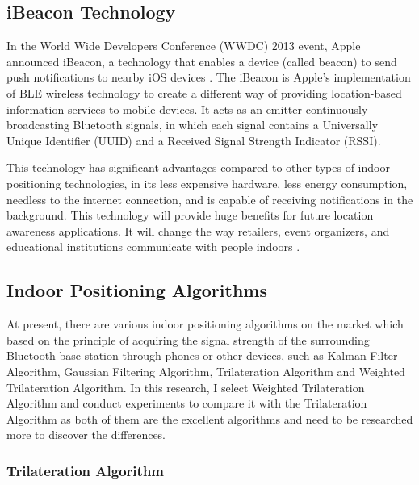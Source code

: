 \documentclass{sigchi}
\begin{document}
\subsection{iBeacon Technology}

In the World Wide Developers Conference (WWDC) 2013 event, Apple announced iBeacon, a technology that enables a device (called beacon) to send push notifications to nearby iOS devices \cite{conte2014bluesentinel}. The iBeacon is Apple's implementation of BLE wireless technology to create a different way of providing location-based information services to mobile devices. It acts as an emitter continuously broadcasting Bluetooth signals, in which each signal contains a Universally Unique Identifier (UUID) and a Received Signal Strength Indicator (RSSI).

This technology has significant advantages compared to other types of indoor positioning technologies, in its less expensive hardware, less energy consumption, needless to the internet connection, and is capable of receiving notifications in the background. This technology will provide huge benefits for future location awareness applications. It will change the way retailers, event organizers, and educational institutions communicate with people indoors \cite{fard2015indoor}. 


\subsection{Indoor Positioning Algorithms}

At present, there are various indoor positioning algorithms on the market which based on the principle of acquiring the signal strength of the surrounding Bluetooth base station through phones or other devices, such as Kalman Filter Algorithm, Gaussian Filtering Algorithm, Trilateration Algorithm and Weighted Trilateration Algorithm. In this research, I select Weighted Trilateration Algorithm and conduct experiments to compare it with the Trilateration Algorithm as both of them are the excellent algorithms and need to be researched more to discover the differences.

\subsubsection{Trilateration Algorithm}
\end{document}
